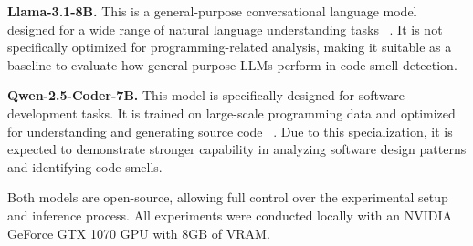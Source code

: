 \documentclass[sigconf,review,anonymous]{acmart}
\begin{document}

\textbf{Llama-3.1-8B.} This is a general-purpose conversational language model designed for a wide range of natural language understanding tasks ~\cite{grattafiori2024llama}. It is not specifically optimized for programming-related analysis, making it suitable as a baseline to evaluate how general-purpose LLMs perform in code smell detection.

\textbf{Qwen-2.5-Coder-7B.} This model is specifically designed for software development tasks. It is trained on large-scale programming data and optimized for understanding and generating source code ~\cite{hui2024qwen2}. Due to this specialization, it is expected to demonstrate stronger capability in analyzing software design patterns and identifying code smells.


Both models are open-source, allowing full control over the experimental setup and inference process. All experiments were conducted locally with an NVIDIA GeForce GTX 1070 GPU with 8GB of VRAM.
\end{document}
